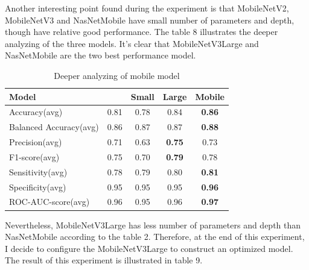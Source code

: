 \documentclass[sensors,article,submit,pdftex,moreauthors]{Definitions/mdpi}
\begin{document}
Another interesting point found during the experiment is that MobileNetV2, MobileNetV3 and NasNetMobile have small number of parameters and depth, though have relative good performance. The table 8 illustrates the deeper analyzing of the three models. It's clear that MobileNetV3Large and NasNetMobile are the two best performance model.
\FloatBarrier
\begin{table}[ht]
	\centering	
	\begin{tabular}{|l | c | c | c | c|} 
		\hline
		Model & \cite{04381} & \cite{02244}Small & \cite{02244}Large & \cite{07012}Mobile\\
		\hline
		Accuracy(avg) & 0.81 & 0.78 & 0.84 & \textbf{0.86}\\
		\hline
		Balanced Accuracy(avg) & 0.86 & 0.87 & 0.87 & \textbf{0.88}\\ 
		\hline
		Precision(avg) & 0.71 & 0.63 & \textbf{0.75} & 0.73\\
		\hline
		F1-score(avg) & 0.75 & 0.70 & \textbf{0.79} & 0.78\\
		\hline
		Sensitivity(avg) & 0.78 & 0.79 & 0.80 & \textbf{0.81}\\ 
		\hline
		Specificity(avg) & 0.95 & 0.95 & 0.95 & \textbf{0.96}\\
		\hline
		ROC-AUC-score(avg) & 0.96 & 0.95 & 0.96 & \textbf{0.97}\\
		\hline
	\end{tabular}
	\caption{Deeper analyzing of mobile model}
	\label{table:7}
\end{table}
\FloatBarrier
Nevertheless, MobileNetV3Large has less number of parameters and depth than NasNetMobile according to the table 2. Therefore, at the end of this experiment, I decide to configure the MobileNetV3Large to construct an optimized model. The result of this experiment is illustrated in table 9.
\FloatBarrier
\end{document}
